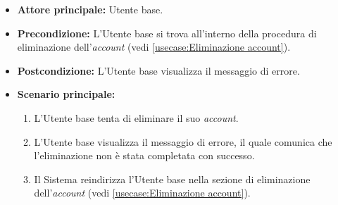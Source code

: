 \label{usecase:Visualizzazione errore eliminazione account}
\begin{itemize}
	\item \textbf{Attore principale:} Utente base.

	\item \textbf{Precondizione:}
	      L'Utente base si trova all'interno della procedura di eliminazione dell'\textit{account} (vedi \autoref{usecase:Eliminazione account}).

	\item \textbf{Postcondizione:}
	      L'Utente base visualizza il messaggio di errore.

	\item \textbf{Scenario principale:}
	      \begin{enumerate}
		      \item L'Utente base tenta di eliminare il suo \textit{account}.
		      \item L'Utente base visualizza il messaggio di errore, il quale comunica che l'eliminazione non è stata completata con successo.
		      \item Il Sistema reindirizza l'Utente base nella sezione di eliminazione dell'\textit{account} (vedi \autoref{usecase:Eliminazione account}).
	      \end{enumerate}
\end{itemize}
